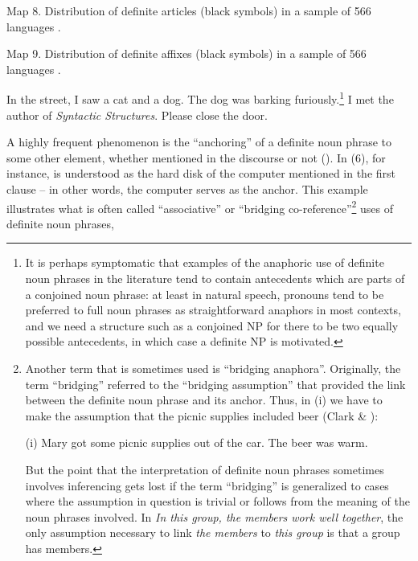 \label{bkm:Ref130721880}Map 8. Distribution of definite articles (black symbols) in a sample of 566 languages \citep{Dryer2005}.


Map 9. Distribution of definite affixes (black symbols) in a sample of 566 languages \citep{Dryer2005}.


\ea 
	\gl	\label{bkm:Ref93745057}In the street, I saw a cat and a dog. The dog was barking furiously.\footnote{ It is perhaps symptomatic that examples of the anaphoric use of definite noun phrases in the literature tend to contain antecedents which are parts of a conjoined noun phrase: at least in natural speech, pronouns tend to be preferred to full noun phrases as straightforward anaphors in most contexts, and we need a structure such as a conjoined NP for there to be two equally possible antecedents, in which case a definite NP is motivated.}
\z 
\ea 
	\gl	\label{bkm:Ref93745078}I met the author of \textit{Syntactic Structures}.
\z 
\ea 
	\gl \label{bkm:Ref93745091}Please close the door. 
\z 

A highly frequent phenomenon is the “anchoring” of a definite noun phrase to some other element, whether mentioned in the discourse or not (\citet[25]{Fraurud1992}). In (6), for instance,  is understood as the hard disk of the computer mentioned in the first clause – in other words, the computer serves as the anchor.  This example illustrates what is often called “associative” or “bridging co-reference”\footnote{ Another term that is sometimes used is “bridging anaphora”. Originally, the term “bridging” referred to the “bridging assumption” that provided the link between the definite noun phrase and its anchor. Thus, in (i) we have to make the assumption that the picnic supplies included beer (Clark \& \citet{Haviland1974}):\par (i) Mary got some picnic supplies out of the car. The beer was warm. \par But the point that the interpretation of definite noun phrases sometimes involves inferencing gets lost if the term “bridging” is generalized to cases where the assumption in question is trivial or follows from the meaning of the noun phrases involved. In \textit{In this group, the members work well together}, the only assumption necessary to link \textit{the members} to \textit{this group} is that a group has members. } uses of definite noun phrases,

